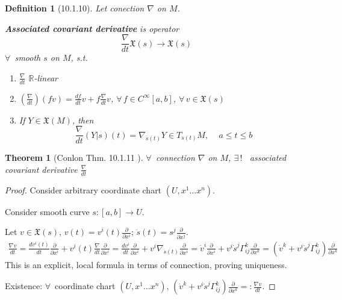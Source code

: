 \documentclass[10pt]{amsart}
\newtheorem{theorem}{Theorem}
\newtheorem{definition}{Definition}
\begin{document}
\begin{multicols*}{2}
\begin{definition}[10.1.10]
Let conection $\nabla$ on $M$.  

\textbf{Associated covariant derivative} is operator 
\[
\frac{\nabla}{dt} \mathfrak{X}(s) \to \mathfrak{X}(s)
\]
$\forall \, $ smooth $s$ on $M$, s.t. 
\begin{enumerate}
\item $\frac{\nabla}{dt}$ $\mathbb{R}$-linear 
\item $\left( \frac{\nabla}{dt} \right)(fv) = \frac{df}{dt} v+ f\frac{\nabla}{dt} v$, $\forall \, f \in C^{\infty}[a,b]$, $\forall \, v\in \mathfrak{X}(s)$  
\item If $Y\in \mathfrak{X}(M)$, then
\[
\frac{\nabla}{dt} (Y|s)(t) = \nabla_{ \dot{s}(t)}Y \in T_{s(t)} M, \quad \, a\leq t \leq b
\]
\end{enumerate}
\end{definition}












\begin{theorem}[Conlon Thm. 10.1.11\cite{Conl2008} ]
	$\forall \, $ connection $\nabla$ on $M$, $\exists \, !$ \, associated covariant derivative $\frac{ \nabla }{dt}$
\end{theorem}

\begin{proof}
	Consider arbitrary coordinate chart $(U,x^1 \dots x^n)$.  
	
	Consider smooth curve $s:[a,b]\to U$.  
	
	Let $v\in \mathfrak{X}(s)$, $v(t) = v^i(t) \frac{ \partial }{ \partial x^i}$; $\dot{s}(t) = s^j \frac{ \partial }{ \partial x^j}$.  
	\[
	\begin{gathered}
	\frac{ \nabla v}{ dt} = \frac{dv^i(t) }{dt}\frac{ \partial }{ \partial x^i} + v^i(t) \frac{ \nabla}{dt} \frac{ \partial }{ \partial x^i} = \frac{ d v^i }{dt}	\frac{ \partial }{ \partial x^i} + v^i \nabla_{ \dot{s}(t) } \frac{ \partial }{ \partial x^i } = \dot{v}^i \frac{ \partial }{ \partial x^i } + v^i\dot{s}^j \Gamma^k_{ij} \frac{ \partial }{ \partial x^k} = \left( \dot{v}^k + v^i \dot{s}^j \Gamma^k_{ij} \right)\frac{ \partial }{ \partial x^k} \end{gathered}
	\]
	This is an explicit, local formula in terms of connection, proving uniqueness.  
	
	Existence: $\forall \, $ coordinate chart $(U,x^1\dots x^n)$, $\left( \dot{v}^k + v^i \dot{s}^j \Gamma_{ij}^k \right) \frac{ \partial }{ \partial x^k } =: \frac{ \nabla v}{dt}$.  
	

\end{proof}
\end{multicols*}
\end{document}
